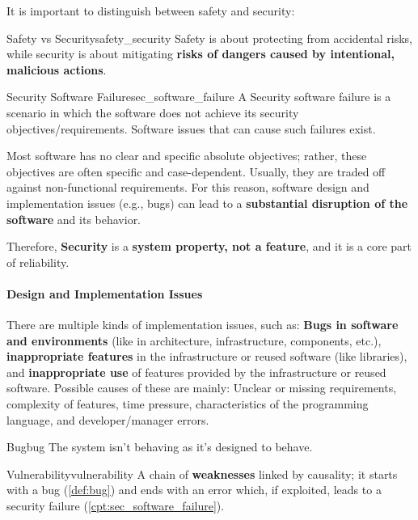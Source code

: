 It is important to distinguish between safety and security:
\begin{concept}{Safety vs Security}{safety_security}
    Safety is about protecting from accidental risks, while security is about mitigating \textbf{risks of dangers caused by intentional, malicious actions}.
\end{concept}

\begin{concept}{Security Software Failure}{sec_software_failure}
    A Security software failure is a scenario in which the software does not achieve its security objectives/requirements. Software issues that can cause such failures exist.
\end{concept}

Most software has no clear and specific absolute objectives; rather, these objectives are often specific and case-dependent. Usually, they are traded off against non-functional requirements. For this reason, software design and implementation issues (e.g., bugs) can lead to a \textbf{substantial disruption of the software} and its behavior.

Therefore, \textbf{Security} is a \textbf{system property, not a feature}, and it is a core part of reliability.


\paragraph{Design and Implementation Issues}
There are multiple kinds of implementation issues, such as: \textbf{Bugs in software and environments} (like in architecture, infrastructure, components, etc.), \textbf{inappropriate features} in the infrastructure or reused software (like libraries), and \textbf{inappropriate use} of features provided by the infrastructure or reused software. Possible causes of these are mainly: Unclear or missing requirements, complexity of features, time pressure, characteristics of the programming language, and developer/manager errors.

\begin{definition}{Bug}{bug}
    The system isn't behaving as it's designed to behave.
\end{definition}

\begin{definition}{Vulnerability}{vulnerability}
    A chain of \textbf{weaknesses} linked by causality; it starts with a bug (\cref{def:bug}) and ends with an error which, if exploited, leads to a security failure (\cref{cpt:sec_software_failure}).
\end{definition}

